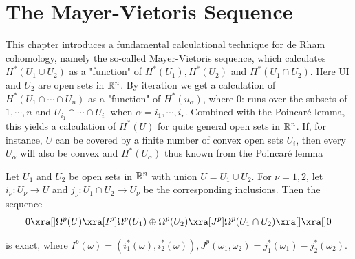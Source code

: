 \chapter{The Mayer-Vietoris Sequence}
This chapter introduces a fundamental calculational technique for de Rham
cohomology, namely the so-called Mayer-Vietoris sequence, which calculates
$H^*(U_1\cup U_2)$ as a "function" of $H^*(U_1), H^*(U_2)$ and $H^*(U_1\cap U_2)$. Here UI and
$U_2$ are open sets in $\mathbb{R}^n$. By iteration we get a calculation of $H^*(U_1\cap\cdots\cap U_n)$ as
a "function" of $H^*(u_\alpha)$, where 0: runs over the subsets of ${1,\cdots, n}$ and 
$U_{i_1}\cap\cdots\cap U_{i_r}$ when $\alpha = {i_1,\cdots, i_r }$. Combined with the Poincar\'e lemma, this
yields a  calculation of $H^*(U)$ for quite general open sets in $\mathbb{R}^n$. If, for
instance, $U$ can be covered by a finite number of convex open sets $U_i$, then every
$U_\alpha$ will also be convex and $H^*(U_\alpha)$ thus known from the Poincar\'e lemma


\begin{theorem}\label{theorem:5-1}
Let $U_1$ and $U_2$ be open sets in $\mathbb{R}^n$ with union $U = U_1\cup U_2$. For $\nu = 1, 2$, let 
$i_\nu: U_\nu\to U$ and $j_\nu:U_1\cap U_2\to U_\nu$ be the corresponding inclusions. Then the sequence
\begin{align*}
  0\xra[]\Omega^p(U)\xra[I^p]\Omega^p(U_1)\oplus\Omega^p(U_2)\xra[J^p]\Omega^p(U_1\cap U_2)\xra[]\xra[]0
\end{align*}

is exact, where $I^p(\omega) = (i^*_1(\omega), i^*_2(\omega)), J^p(\omega_1, \omega_2) = j^*_1(\omega_1) - j^*_2(\omega_2)$.
\end{theorem}

